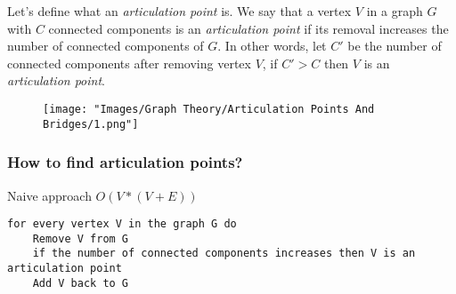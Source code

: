 \vspace*{2em}
Let's define what an \textit{articulation point} is. We say that a vertex $V$ in a graph $G$ with $C$
connected components is an \textit{articulation point} if its removal increases the number of connected components of $G$.
In other words, let $C'$ be the number of connected components after removing vertex $V$, if $C' > C$ then $V$ is an \textit{articulation point}.

\begin{figure}[H]
  \centering
  \texttt{[image: "Images/Graph Theory/Articulation Points And Bridges/1.png"]}
\end{figure}

\subsubsection*{How to find articulation points?}
\bullet Naive approach $O(V * (V + E))$

\begin{verbatim}
for every vertex V in the graph G do
    Remove V from G
    if the number of connected components increases then V is an articulation point
    Add V back to G
\end{verbatim}